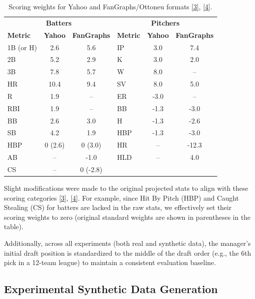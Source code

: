 \documentclass[11pt,a4paper]{article}
\begin{document}
\begin{table}[H]
\centering
\caption{Scoring weights for Yahoo and FanGraphs/Ottoneu formats \hyperref[ref:yahoo-scoring]{[3]}, \hyperref[ref:fangraphs-scoring]{[4]}.}
\label{tab:scoring_weights}
\small
\begin{tabular}{l c c | l c c}
\toprule
\multicolumn{3}{c|}{\textbf{Batters}} & \multicolumn{3}{c}{\textbf{Pitchers}} \\
\textbf{Metric} & \textbf{Yahoo} & \textbf{FanGraphs} & \textbf{Metric} & \textbf{Yahoo} & \textbf{FanGraphs} \\
\midrule
1B (or H) & 2.6 & 5.6 & IP  & 3.0 & 7.4 \\
2B        & 5.2 & 2.9 & K   & 3.0 & 2.0 \\
3B        & 7.8 & 5.7 & W   & 8.0 & --  \\
HR        & 10.4& 9.4 & SV  & 8.0 & 5.0 \\
R         & 1.9 & --  & ER  & -3.0& --  \\
RBI       & 1.9 & --  & BB  & -1.3& -3.0\\
BB        & 2.6 & 3.0 & H   & -1.3& -2.6\\
SB        & 4.2 & 1.9 & HBP & -1.3& -3.0\\
HBP       & 0 (2.6) & 0 (3.0) & HR  & --  &-12.3\\
AB        & --  &-1.0 & HLD & --  & 4.0 \\
CS        & --  &0 (-2.8) &     &     &     \\
\bottomrule
\end{tabular}
\end{table}

Slight modifications were made to the original projected stats to align with these scoring categories \hyperref[ref:yahoo-scoring]{[3]}, \hyperref[ref:fangraphs-scoring]{[4]}. For example, since Hit By Pitch (HBP) and Caught Stealing (CS) for batters are lacked in the raw stats, we effectively set their scoring weights to zero (original standard weights are shown in parentheses in the table). 

Additionally, across all experiments (both real and synthetic data), the manager's initial draft position is standardized to the middle of the draft order (e.g., the 6th pick in a 12-team league) to maintain a consistent evaluation baseline.

\subsection{Experimental Synthetic Data Generation}
\end{document}
